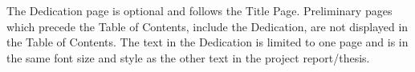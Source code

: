 
The Dedication page is optional and follows the Title Page. Preliminary pages which precede the Table of Contents, include the Dedication, are not displayed in the Table of Contents.   The text in the Dedication is limited to one page and is in the same font size and style as the other text in the project report/thesis.



